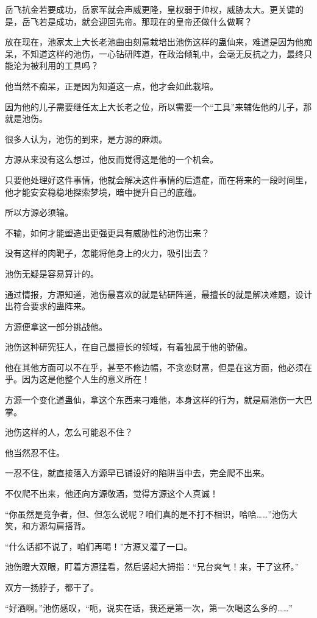 \begin{this_body}
岳飞抗金若要成功，岳家军就会声威更隆，皇权弱于帅权，威胁太大。更关键的是，岳飞若是成功，就会迎回先帝。那现在的皇帝还做什么做啊？

放在现在，池家太上大长老池曲由刻意栽培出池伤这样的蛊仙来，难道是因为他痴呆，不知道这样的池伤，一心钻研阵道，在政治倾轧中，会毫无反抗之力，最终只能沦为被利用的工具吗？

他当然不痴呆，正是因为知道这一点，他才会如此栽培。

因为他的儿子需要继任太上大长老之位，所以需要一个“工具”来辅佐他的儿子，那就是池伤。

很多人认为，池伤的到来，是方源的麻烦。

方源从来没有这么想过，他反而觉得这是他的一个机会。

只要他处理好这件事情，他就会解决这件事情的后遗症，而在将来的一段时间里，他才能安安稳稳地探索梦境，暗中提升自己的底蕴。

所以方源必须输。

不输，如何才能塑造出更强更具有威胁性的池伤出来？

没有这样的肉靶子，怎能将他身上的火力，吸引出去？

池伤无疑是容易算计的。

通过情报，方源知道，池伤最喜欢的就是钻研阵道，最擅长的就是解决难题，设计出符合要求的蛊阵来。

方源便拿这一部分挑战他。

池伤这种研究狂人，在自己最擅长的领域，有着独属于他的骄傲。

他在其他方面可以不在乎，甚至不修边幅，不贪恋财富，但是在这方面，他必须在乎。因为这是他整个人生的意义所在！

方源一个变化道蛊仙，拿这个东西来刁难他，本身这样的行为，就是扇池伤一大巴掌。

池伤这样的人，怎么可能忍不住？

他当然忍不住。

一忍不住，就直接落入方源早已铺设好的陷阱当中去，完全爬不出来。

不仅爬不出来，他还向方源敬酒，觉得方源这个人真诚！

“你虽然是竞争者，但、但怎么说呢？咱们真的是不打不相识，哈哈……”池伤大笑，和方源勾肩搭背。

“什么话都不说了，咱们再喝！”方源又灌了一口。

池伤瞪大双眼，盯着方源猛看，然后竖起大拇指：“兄台爽气！来，干了这杯。”

双方一扬脖子，都干了。

“好酒啊。”池伤感叹，“呃，说实在话，我还是第一次，第一次喝这么多的……”


\end{this_body}
